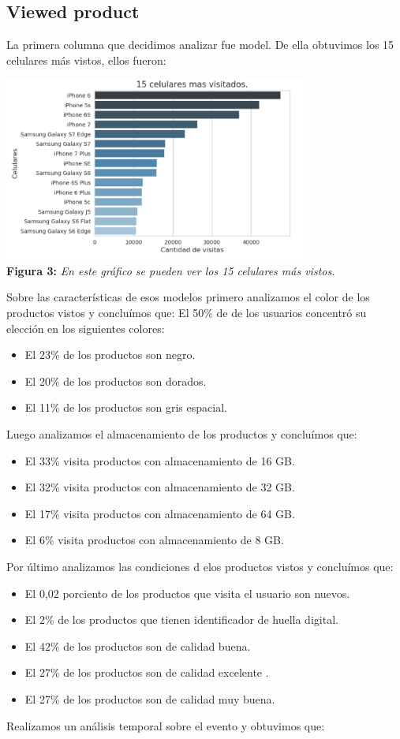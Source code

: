 \documentclass[titlepage,a4paper]{article}
\begin{document}
	\subsection{Viewed product}
	La primera columna que decidimos analizar fue model. De ella obtuvimos los 15 celulares más vistos, ellos fueron:
	\begin{center}
	\includegraphics[width=10cm]{15celularesMasVisitados.jpg}\\
	\textbf{Figura 3:}  \textit{En este gráfico se pueden ver los 15 celulares más vistos.  }
	\end{center}
	 Sobre las características de esos modelos primero analizamos el color de los productos vistos y concluímos que: 
	 El 50\% de de los usuarios concentró su elección en los siguientes colores:
	 \begin{itemize}
	 \item El 23\% de los productos son negro.
	\item El 20\% de los productos son dorados.
	\item El 11\% de los productos son gris espacial.
	\end{itemize}	  
	Luego analizamos el almacenamiento de los productos y concluímos que:
	\begin{itemize}
	\item El 33\% visita productos con almacenamiento de 16 GB.
    \item El 32\% visita productos con almacenamiento de 32 GB.
    \item El 17\% visita productos con almacenamiento de 64 GB.
    \item El 6\% visita productos con almacenamiento de 8 GB.
	\end{itemize}
	Por último analizamos las condiciones d elos productos vistos y concluímos que:
	\begin{itemize}
	\item El 0,02 porciento de los productos que visita el usuario son nuevos.    
    \item El 2\% de los productos que tienen identificador de huella digital. 
    \item El 42\% de los productos son de calidad buena.
    \item El 27\% de los productos son de calidad excelente .
    \item El 27\% de los productos son de calidad muy buena.
	\end{itemize}
	Realizamos un análisis temporal sobre el evento y obtuvimos que:
	
\end{document}
